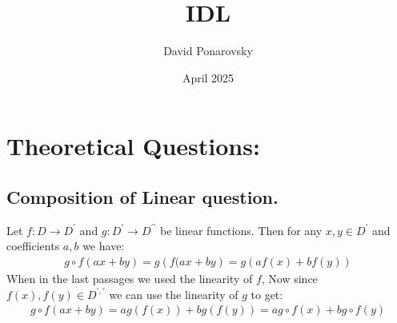 \documentclass{article}
\title{IDL}
\author{David Ponarovsky}
\date{April 2025}
\begin{document}
\maketitle

\section{Theoretical Questions:}

\subsection{Composition of Linear question.}
Let $f : D \rightarrow D^\prime$ and $g : D^\prime  \rightarrow D^{\prime \prime}$ be linear functions. Then for any $x,y\in D^\prime$ and coefficients $a,b$ we have: 
\begin{equation*}
    \begin{split}
        g \circ f (ax + by) = g\left( f(ax + by \right) = g \left( af(x) +bf(y)\right)
    \end{split}
\end{equation*}
When in the last passages we used the linearity of $f$, Now since $f(x),f(y) \in D^{\prime, \prime}$ we can use the linearity of $g$ to get: 
\begin{equation*}
    \begin{split}
        g \circ f (ax + by) = ag(f(x)) + bg(f(y)) = a g \circ f (x) + b g \circ f(y)
    \end{split}
\end{equation*}
\end{document}
